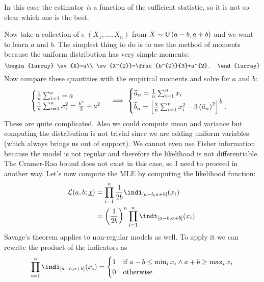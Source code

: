 \documentclass[12pt]{report}
\begin{document}
In this case the estimator \textit{is} a function of the sufficient statistic, so it is not so clear which one is the best.\par
Now take a collection of \rv s $(X_{1},\ldots,X_{n})$ from $X\sim\mathsf{U}\left(a-b,a+b\right)$ and we want to learn $a$ and $b$. The simplest thing to do is to use the method of moments because the uniform distribution has very simple moments:
\begin{equation*}
	\begin{larray}
		\ev{X}=a\\
		\ev{X^{2}}=\frac{b^{2}}{3}+a^{2}.
	\end{larray}
\end{equation*}
Now compare these quantities with the empirical moments and solve for $a$ and $b$:
\begin{equation*}
	\begin{cases}
		\frac{1}{n}\sum_{i=1}^{x}=a\\
		\frac{1}{n}\sum_{i=1}^{n}x_{i}^{2}=\frac{b^{2}}{3}+a^{2}
	\end{cases}\implies\begin{cases}
	\widetilde{a}_{n}=\frac{1}{n}\sum_{i=1}^{n}x_{i}\\
	\widetilde{b}_{n}=\left[\frac{3}{n}\sum_{i=1}^{n}x_{i}^{2}-3\left(\widetilde{a}_{n}\right)^{2}\right]^{\frac{1}{2}}.
	\end{cases}
\end{equation*}
These are quite complicated. Also we could compute mean and variance but computing the distribution is not trivial since we are adding uniform variables (which always brings us out of support). We cannot even use Fisher information because the model is not regular and therefore the likelihood is not differentiable. The Cramer-Rao bound does not exist in this case, so I need to proceed in another way. Let's now compute the MLE by computing the likelihood function:
\begin{align*}
	\like(a,b;\ulx)&=\prod_{i=1}^{n}\frac{1}{2b}\indi_{[a-b,a+b]}(x_{i})\\
	&=\left(\frac{1}{2b}\right)^{n}\prod_{i=1}^{n}\indi_{[a-b,a+b]}(x_{i}).
\end{align*}
Savage's theorem applies to non-regular models as well. To apply it we can rewrite the product of the indicators as
\begin{align*}
	\prod_{i=1}^{n}\indi_{[a-b,a+b]}(x_{i})=\begin{cases}
		1&\text{if }a-b\leq\min_{i}x_{i}\wedge a+b\geq\max_{i}x_{i}\\
		0&\text{otherwise}
	\end{cases}
\end{align*}
\end{document}
